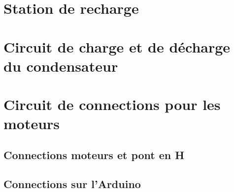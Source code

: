 

\section{Station de recharge}
\label{s:Recharge}




\section{Circuit de charge et de décharge du condensateur}
\label{s:Condensateur}




\section{Circuit de connections pour les moteurs}
\label{Connections}

\subsection{Connections moteurs et pont en H}
\label{Moteurs}



\subsection{Connections sur l'Arduino}
\label{Arduino}




